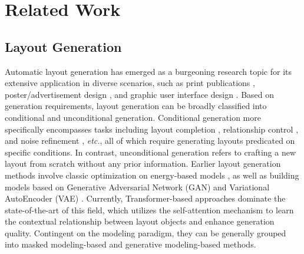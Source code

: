 \section{Related Work}
\label{sec::related}
\subsection{Layout Generation}
Automatic layout generation has emerged as a burgeoning research topic for its extensive application in diverse scenarios, such as print publications \cite{publaynet2019zhong,magazine2019zheng,read2020patil,vtn2021arroyo}, poster/advertisement design \cite{poster2021guo,poster2021qian}, and graphic user interface design \cite{rico2017deka,ruite2021rahman,layoutganpp2021kikuchi,ganbased2021lis}. Based on generation requirements, layout generation can be broadly classified into conditional and unconditional generation. Conditional generation more specifically encompasses tasks including layout completion \cite{layouttf2021gupta,layoutnuwa2024tang}, relationship control \cite{lee2020neural,layoutganpp2021kikuchi,layoutdm2023Inoue}, and noise refinement \cite{lee2020neural,ruite2021rahman,layoutprompter2023lin}, \emph{etc.}, all of which require generating layouts predicated on specific conditions. In contrast, unconditional generation refers to crafting a new layout from scratch without any prior information. Earlier layout generation methods involve classic optimization on energy-based models \cite{convetion2014donovan,convention2015donovan}, as well as building models based on Generative Adversarial Network (GAN) \cite{layoutgan2018li,magazine2019zheng,nauata2020house,ganbased2021lis,layoutganpp2021kikuchi} and Variational AutoEncoder (VAE) \cite{layoutvae2019jyothi,lee2020neural,read2020patil}. Currently, Transformer-based approaches dominate the state-of-the-art of this field, which utilizes the self-attention mechanism \cite{attention2017vaswani} to learn the contextual relationship between layout objects and enhance generation quality. Contingent on the modeling paradigm, they can be generally grouped into masked modeling-based and generative modeling-based methods.

